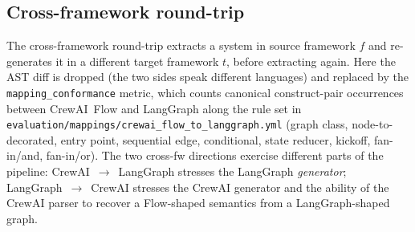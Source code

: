 \subsection{Cross-framework round-trip}\label{sec:cross-framework}

The cross-framework round-trip extracts a system in source framework
$f$ and re-generates it in a different target framework $t$, before
extracting again. Here the AST diff is dropped (the two sides speak
different languages) and replaced by the
\texttt{mapping\_conformance} metric, which counts canonical
construct-pair occurrences between CrewAI~Flow and LangGraph along
the rule set in
\texttt{evaluation/mappings/crewai\_flow\_to\_langgraph.yml} (graph
class, node-to-decorated, entry point, sequential edge, conditional,
state reducer, kickoff, fan-in/and, fan-in/or). The two cross-fw
directions exercise different parts of the pipeline: CrewAI~$\to$~LangGraph
stresses the LangGraph \emph{generator}; LangGraph~$\to$~CrewAI stresses
the CrewAI generator and the ability of the CrewAI parser to recover
a Flow-shaped semantics from a LangGraph-shaped graph.

